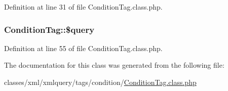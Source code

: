 Definition at line 31 of file Condition\+Tag.\+class.\+php.

\hypertarget{classConditionTag_ab186510e6366ad1033cc9d73cedf1f02}{}
\subsubsection[{\$query}]{\setlength{\rightskip}{0pt plus 5cm}Condition\+Tag\+::\$query}\label{classConditionTag_ab186510e6366ad1033cc9d73cedf1f02}


Definition at line 55 of file Condition\+Tag.\+class.\+php.



The documentation for this class was generated from the following file\+:\begin{DoxyCompactItemize}
\item 
classes/xml/xmlquery/tags/condition/\hyperlink{ConditionTag_8class_8php}{Condition\+Tag.\+class.\+php}\end{DoxyCompactItemize}
